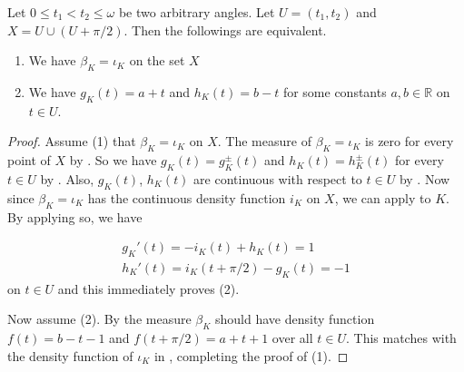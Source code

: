 \begin{theorem}

Let \(0 \leq t_1 < t_2 \leq \omega\) be two arbitrary angles. Let \(U = (t_1, t_2)\) and \(X = U \cup (U + \pi/2)\). Then the followings are equivalent.

\begin{enumerate}
\def\labelenumi{\arabic{enumi}.}
\tightlist
\item
  We have \(\beta_{K} = \iota_{K}\) on the set \(X\)
\item
  We have \(g_K(t) = a + t\) and \(h_K(t) = b - t\) for some constants \(a, b \in \mathbb{R}\) on \(t \in U\).
\end{enumerate}

\label{thm:balanced-ACx}
\end{theorem}

\begin{proof}
Assume (1) that \(\beta_K = \iota_K\) on \(X\). The measure of \(\beta_K = \iota_K\) is zero for every point of \(X\) by . So we have \(g_K(t) = g^\pm_K(t)\) and \(h_K(t) = h_K^{\pm}(t)\) for every \(t \in U\) by . Also, \(g_K(t)\), \(h_K(t)\) are continuous with respect to \(t \in U\) by . Now since \(\beta_K = \iota_K\) has the continuous density function \(i_K\) on \(X\), we can apply  to \(K\). By applying so, we have

\begin{gather}
g_{K}'(t) = -i_K(t) + h_{K}(t) = 1 \\
h_K'(t) = i_K(t + \pi/2) - g_K(t) = -1
\end{gather}
on \(t \in U\) and this immediately proves (2).

Now assume (2). By  the measure \(\beta_K\) should have density function \(f(t) = b - t - 1\) and \(f(t + \pi/2) = a + t + 1\) over all \(t \in U\). This matches with the density function of \(\iota_K\) in , completing the proof of (1).
\end{proof}

